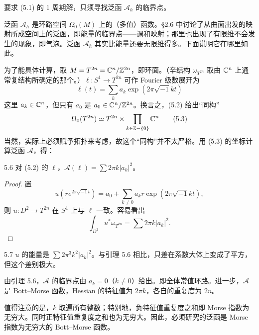 要求 (5.1) 的 1 周期解，只须寻找泛函 $\mathcal{A}_h$ 的临界点。

泛函 $\mathcal{A}_h$ 是环路空间 $\Omega_0(M)$ 上的（多值）函数。§2.6 中讨论了从曲面出发的映射所成空间上的泛函，即能量的临界点——调和映射；那里也出现了有限维不会发生的现象，即气泡。泛函 $\mathcal{A}_h$ 其实比能量还要无限维得多。下面说明它在哪里如此。

为了能具体计算，取 $M=T^{2n}=\mathbb{C}^n/\mathbb{Z}^{2n}$，即环面。（辛结构 $\omega_{T^{2n}}$ 取由 $\mathbb{C}^n$ 上通常复结构所确定的那个。）$\ell\colon S^1\to T^{2n}$ 可作 Fourier 级数展开为
\begin{equation}
  \ell(t)=\sum_ka_k\exp(2\pi\sqrt{-1}kt) \tag{5.2}
\end{equation}
这里 $a_k\in\mathbb{C}^n$，但只有 $a_0$ 是 $a_0\in\mathbb{C}^n/\mathbb{Z}^{2n}$。换言之，(5.2) 给出“同构”
\begin{equation}
  \Omega_0(T^{2n})\simeq T^{2n}\times\prod_{k\in\mathbb{Z}-\{0\}}\mathbb{C}^n \tag{5.3}
\end{equation}
当然，实际上必须赋予拓扑来考虑，故这个“同构”并不太严格。用 (5.3) 的坐标计算泛函 $\mathcal{A}$，得：

\begin{lemma*}{5.6}
  对 (5.2) 的 $\ell$，$\mathcal{A}(\ell)=\sum 2\pi k|a_k|^2$。
\end{lemma*}

\begin{proof}
  置
  \[
    u(re^{2\pi\sqrt{-1}t})=a_0+\sum_{k\ne0}a_kr\exp(2\pi\sqrt{-1}kt),
  \]
  则 $u\colon D^2\to T^{2n}$ 在 $S^1$ 上与 $\ell$ 一致。容易看出
  \[
    \int_{D^2}u^*\omega_{T^{2n}}=\sum 2\pi k|a_k|^2.
  \]
\end{proof}

\begin{remark}{5.7}
  $u$ 的能量是 $\sum 2\pi^3k^2|a_k|^2$。与引理 5.6 相比，只差在系数大体上变成了平方，但这个差别极大。
\end{remark}


由引理 5.6，$\mathcal{A}$ 的临界点由 $a_k=0$（$k\ne0$）给出。即全体常值环路。进一步，$\mathcal{A}$ 是 Bott–Morse 函数，Hessian 的特征值为 $2\pi k$，各自的重复度为 $2n$。

值得注意的是，$k$ 取遍所有整数；特别地，负特征值重复度之和即 Morse 指数为无穷大。同时正特征值重复度之和也为无穷大。因此，必须研究的泛函是 Morse 指数为无穷大的 Bott–Morse 函数。

